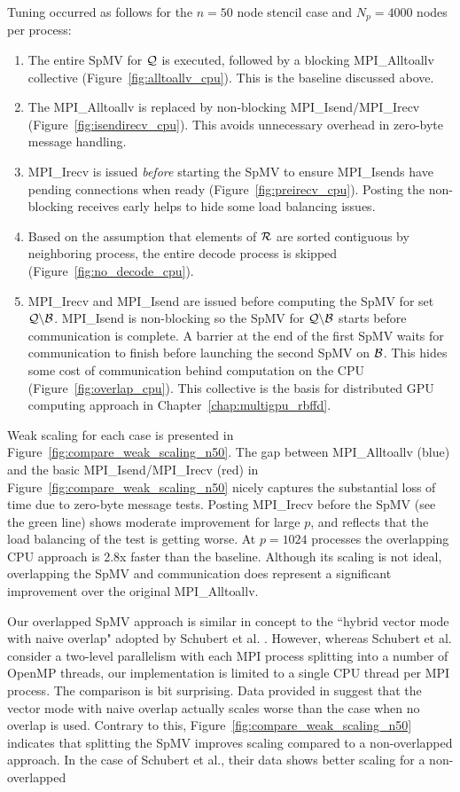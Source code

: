 \documentclass{report}
\begin{document}
Tuning occurred as follows for the $n=50$ node stencil case and $N_p=4000$ nodes per process:  
\begin{enumerate} 
\item The entire SpMV for $\mathcal{Q}$ is executed, followed by a blocking MPI\_Alltoallv collective (Figure~\ref{fig:alltoallv_cpu}). This is the baseline discussed above.
\item The MPI\_Alltoallv is replaced by non-blocking MPI\_Isend/MPI\_Irecv (Figure~\ref{fig:isendirecv_cpu}). This avoids unnecessary overhead in zero-byte message handling. 
\item MPI\_Irecv is issued \emph{before} starting the SpMV to ensure MPI\_Isends have pending connections when ready (Figure~\ref{fig:preirecv_cpu}). Posting the non-blocking receives early helps to hide some load balancing issues. 
\item Based on the assumption that elements of $\mathcal{R}$ are sorted contiguous by neighboring process, the entire decode process is skipped (Figure~\ref{fig:no_decode_cpu}). 
\item MPI\_Irecv and MPI\_Isend are issued before computing the SpMV for set $\mathcal{Q} \backslash \mathcal{B}$. MPI\_Isend is non-blocking so the SpMV for $\mathcal{Q} \backslash \mathcal{B}$ starts before communication is complete. A barrier at the end of the first SpMV waits for communication to finish before launching the second SpMV on $\mathcal{B}$. This hides some cost of communication behind computation on the CPU (Figure~\ref{fig:overlap_cpu}). This collective is the basis for distributed GPU computing approach in Chapter~\ref{chap:multigpu_rbffd}.
\end{enumerate}
\noindent Weak scaling for each case is presented in Figure~\ref{fig:compare_weak_scaling_n50}. The gap between MPI\_Alltoallv (blue) and the basic MPI\_Isend/MPI\_Irecv (red) in Figure~\ref{fig:compare_weak_scaling_n50} nicely captures the substantial loss of time due to zero-byte message tests. Posting MPI\_Irecv before the SpMV (see the green line) shows moderate improvement for large $p$, and reflects that the load balancing of the test is getting worse. At $p=1024$ processes the overlapping CPU approach is 2.8x faster than the baseline. Although its scaling is not ideal, overlapping the SpMV and communication does represent a significant improvement over the original MPI\_Alltoallv. %


Our overlapped SpMV approach is similar in concept to the ``hybrid vector mode with naive overlap" adopted by Schubert et al. \cite{Schubert2011}. However, whereas Schubert et al. consider a two-level parallelism with each MPI process splitting into a number of OpenMP threads, our implementation is limited to a single CPU thread per MPI process. The comparison is bit surprising. Data provided in \cite{Schubert2011} suggest that the vector mode with naive overlap actually scales worse than the case when no overlap is used. Contrary to this, Figure~\ref{fig:compare_weak_scaling_n50} indicates that splitting the SpMV improves scaling compared to a non-overlapped approach. In the case of Schubert et al., their data shows better scaling for a non-overlapped 
\end{document}

